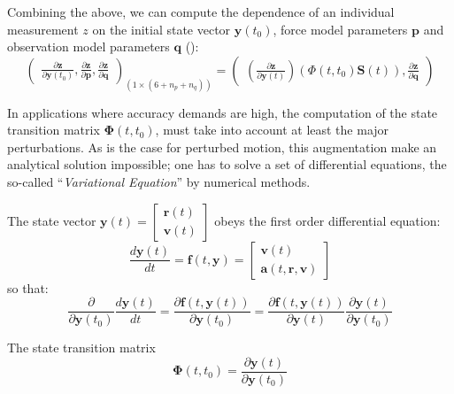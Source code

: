Combining the above, we can compute the dependence of an individual measurement 
$z$ on the initial state vector $\bm{y}(t_0)$, force model parameters $\bm{p}$ 
and observation model parameters $\bm{q}$ (\cite{Montenbruck2000}):
\begin{equation}
  \begin{pmatrix}
    \frac{\partial \bm{z}}{\partial \bm{y}(t_0)}, 
    \frac{\partial \bm{z}}{\partial \bm{p}}, 
    \frac{\partial \bm{z}}{\partial \bm{q}}
  \end{pmatrix}_{(1 \times (6+n_p+n_q))} = 
  \begin{pmatrix}
    \left( \frac{\partial \bm{z}}{\partial \bm{y}(t)} \right)
    \left( \Phi (t,t_0) \bm{S}(t) \right), 
    \frac{\partial \bm{z}}{\partial \bm{q}}
  \end{pmatrix}
\end{equation}

In applications where accuracy demands are high, the computation of the state 
transition matrix $\bm{\Phi}(t,t_0)$, must take into account at least the major 
perturbations. As is the case for perturbed motion, this augmentation make an 
analytical solution impossible; one has to solve a set of differential equations, 
the so-called ``\emph{Variational Equation}'' by numerical methods.

The state vector $\bm{y}(t) = \begin{bmatrix} \bm{r}(t) \\ \bm{v}(t) \end{bmatrix}$ 
obeys the first order differential equation:
\begin{equation}
  \frac{d \bm{y}(t)}{dt} = \bm{f}(t,\bm{y}) = 
    \begin{bmatrix} \bm{v}(t) \\ \bm{a}(t,\bm{r},\bm{v}) \end{bmatrix}
\end{equation}
so that:
\begin{equation}
  \frac{\partial}{\partial \bm{y}(t_0)}\frac{d\bm{y}(t)}{dt} = 
    \frac{\partial \bm{f}(t,\bm{y}(t))}{\partial \bm{y}(t_0)} = 
    \frac{\partial \bm{f}(t,\bm{y}(t))}{\partial \bm{y}(t)} 
      \frac{\partial \bm{y}(t)}{\partial \bm{y}(t_0)}
\end{equation}

The state transition matrix
\begin{equation}
  \bm{\Phi}(t,t_0) = \frac{\partial \bm{y}(t)}{\partial \bm{y}(t_0)}
\end{equation}


